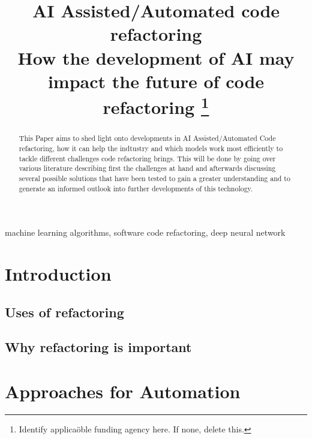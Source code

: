 \documentclass[conference]{IEEEtran}
\begin{document}
\title{AI Assisted/Automated code refactoring\\
{\footnotesize How the development of AI may impact the future of code refactoring}
\thanks{Identify applicaöble funding agency here. If none, delete this.}
}

\author{
    \and
}

\maketitle

\begin{abstract}
    This Paper aims to shed light onto developments in AI Assisted/Automated Code refactoring, how it can help the indtustry and which models work most efficiently to tackle different challenges code refactoring brings. This will be done by going over various literature describing first the challenges at hand and afterwards discussing several possible solutions that have been tested to gain a greater understanding and to generate an informed outlook into further developments of this technology.
\end{abstract}

\begin{IEEEkeywords}
    machine learning algorithms, software code refactoring, deep neural network
\end{IEEEkeywords}

\section{Introduction}

\subsection{Uses of refactoring}
\subsection{Why refactoring is important}

\section{Approaches for Automation}
\end{document}
